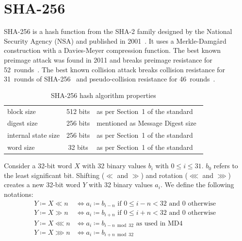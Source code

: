 \section{SHA-256}
\label{sec:dc-sha-256}
%
SHA-256 is a hash function from the SHA-2 family designed by the National Security Agency (NSA)
and published in 2001~\cite{fips-pub-180-4}. It uses a Merkle-Damg\aa{}rd construction
with a Davies-Meyer compression function. The best known preimage attack was found in 2011
and breaks preimage resistance for 52~rounds~\cite{bicliques}. The best known collision attack
breaks collision resistance for 31~rounds of SHA-256~\cite{improving} and pseudo-collision
resistance for 46~rounds~\cite{high2011}.

\begin{table}[!hb]
  \begin{center}
    \begin{tabular}{lcl}
      block size           & 512 bits   & as per Section~1 of the standard~\cite{fips-pub-180-4} \\
      digest size          & 256 bits   & mentioned as Message Digest size~\cite{fips-pub-180-4} \\
      internal state size  & 256 bits   & as per Section~1 of the standard~\cite{fips-pub-180-4} \\
      word size            & 32 bits    & as per Section~1 of the standard~\cite{fips-pub-180-4}
    \end{tabular}
    \caption{SHA-256 hash algorithm properties}
    \label{tab:sha256}
  \end{center}
\end{table}
%
\begin{defi}
  \label{def:shifts}
  Consider a 32-bit word $X$ with 32 binary values $b_i$ with $0 \leq i \leq 31$.
  $b_0$ refers to the least significant bit. Shifting ($≪$ and $≫$) and
  rotation ($⋘$ and $⋙$) creates a new 32-bit word $Y$ with 32 binary values $a_i$.
  We define the following notations:
  \begin{align*}
    Y \coloneqq X ≪ n  &\iff a_i \coloneqq b_{i-n} \text{ if } 0 \leq i-n < 32 \text{ and } 0 \text{ otherwise } \\
    Y \coloneqq X ≫ n  &\iff a_i \coloneqq b_{i+n} \text{ if } 0 \leq i+n < 32 \text{ and } 0 \text{ otherwise } \\
    Y \coloneqq X ⋘ n  &\iff a_i \coloneqq b_{i-n \bmod{32}} \text{ as used in MD4} \\
    Y \coloneqq X ⋙ n  &\iff a_i \coloneqq b_{i+n \bmod{32}}
  \end{align*}
\end{defi}

